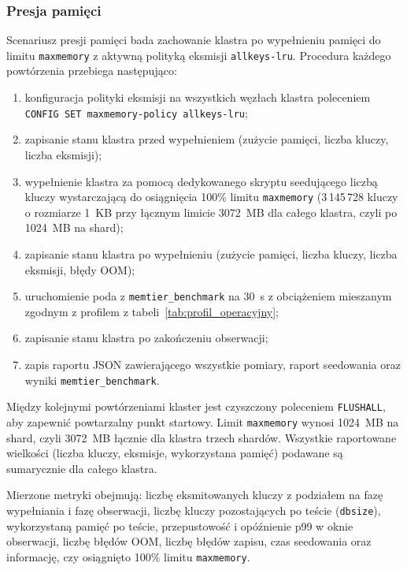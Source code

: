 \subsubsection{Presja pamięci}

Scenariusz presji pamięci bada zachowanie klastra po wypełnieniu pamięci do limitu \texttt{maxmemory} z aktywną polityką eksmisji \texttt{allkeys-lru}. Procedura każdego powtórzenia przebiega następująco:

\begin{enumerate}
    \item konfiguracja polityki eksmisji na wszystkich węzłach klastra poleceniem \texttt{CONFIG SET maxmemory-policy allkeys-lru};
    \item zapisanie stanu klastra przed wypełnieniem (zużycie pamięci, liczba kluczy, liczba eksmisji);
    \item wypełnienie klastra za pomocą dedykowanego skryptu seedującego liczbą kluczy wystarczającą do osiągnięcia 100\% limitu \texttt{maxmemory} (3\,145\,728 kluczy o rozmiarze 1~KB przy łącznym limicie 3072~MB dla całego klastra, czyli po 1024~MB na shard);
    \item zapisanie stanu klastra po wypełnieniu (zużycie pamięci, liczba kluczy, liczba eksmisji, błędy OOM);
    \item uruchomienie poda z \texttt{memtier\_benchmark} na 30~s z obciążeniem mieszanym zgodnym z profilem z tabeli~\ref{tab:profil_operacyjny};
    \item zapisanie stanu klastra po zakończeniu obserwacji;
    \item zapis raportu JSON zawierającego wszystkie pomiary, raport seedowania oraz wyniki \texttt{memtier\_benchmark}.
\end{enumerate}

Między kolejnymi powtórzeniami klaster jest czyszczony poleceniem \texttt{FLUSHALL}, aby zapewnić powtarzalny punkt startowy. Limit \texttt{maxmemory} wynosi 1024~MB na shard, czyli 3072~MB łącznie dla klastra trzech shardów. Wszystkie raportowane wielkości (liczba kluczy, eksmisje, wykorzystana pamięć) podawane są sumarycznie dla całego klastra.

Mierzone metryki obejmują: liczbę eksmitowanych kluczy z podziałem na fazę wypełniania i fazę obserwacji, liczbę kluczy pozostających po teście (\texttt{dbsize}), wykorzystaną pamięć po teście, przepustowość i opóźnienie p99 w oknie obserwacji, liczbę błędów OOM, liczbę błędów zapisu, czas seedowania oraz informację, czy osiągnięto 100\% limitu \texttt{maxmemory}.

